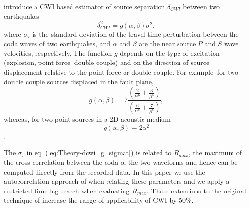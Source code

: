 \documentclass[extra]{gji}
\begin{document}
\citet{dr_Snieder05a} introduce a CWI based estimator of source
separation $\delta_{CWI}$ between two earthquakes
\begin{equation}
\label{eq:Theory-dcwi_g_sigmat}
\delta_{CWI}^2 = g(\alpha,\beta)\sigma_\tau^2,
\end{equation}
where $\sigma_\tau$ is the standard deviation of the travel time perturbation
between the coda waves of two earthquakes,
and $\alpha$ and $\beta$ are the near source $P$ and $S$ wave velocities,
respectively. The function $g$ depends on the type of excitation
(explosion, point force, double couple) and on the direction of
source displacement relative to the point force or double
couple. For example, for two double couple sources displaced in the
fault plane,
\begin{equation}
\label{eq:LitReview-g-3d-dc}
g(\alpha,\beta) = 7
\frac{\left(\frac{2}{\alpha^6}+\frac{3}{\beta^6}\right)}{\left(\frac{6}{\alpha^8}+\frac{7}{\beta^8}\right)},
\end{equation}
whereas, for two point sources in a 2D acoustic medium
\begin{equation}
\label{eq:LitReview-g-2d-ps} g(\alpha,\beta) = 2 \alpha^2
\end{equation}
\citep{dr_Snieder05a}.

The $\sigma_\tau$ in eq. (\ref{eq:Theory-dcwi_g_sigmat}) is related
to $R_{max}$, the maximum of the cross correlation between the coda
of the two waveforms and hence can be computed directly from the
recorded data. In this paper we use the autocorrelation approach of
\citet{dr_Robinson11a} when relating these parameters and we apply a
restricted time lag search when evaluating $R_{max}$. These
extensions to the original technique of \citet{dr_Snieder05a}
increase the range of applicability of CWI by 50\%.
\end{document}
